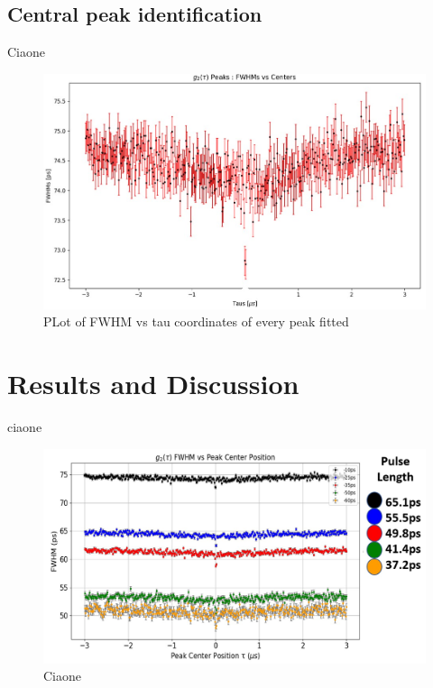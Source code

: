 \subsection{Central peak identification}
\label{subsec:CentralPeakId}
Ciaone
\begin{figure}[hbtp]
\centering
\includegraphics[width=1\textwidth]{FWHMvsTAU_Single.jpg}
\caption{PLot of FWHM vs tau coordinates of every peak fitted}
\label{FWHMvsTauSingle}
\end{figure}

\section{Results and Discussion}
\label{EOMresults}
ciaone

\begin{figure}[hbtp]
\centering
\includegraphics[width=1\textwidth]{FWHMvsTAU_ALL_Version2.jpg}
\caption{Ciaone}
\label{FWHMvsTauGeneral}
\end{figure}

